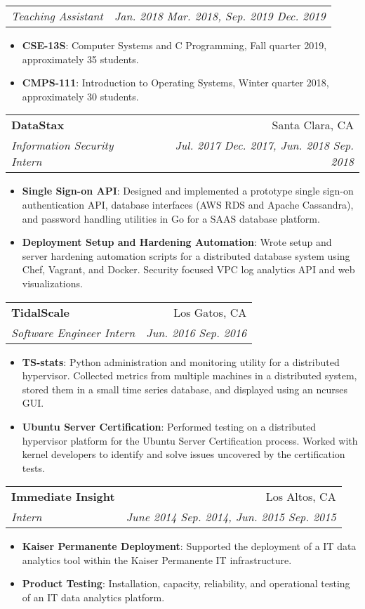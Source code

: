 \documentclass[letterpaper,10pt,oneside]{memoir}
\makeatletter
\newcommand{\resumeItem}[2]{
  \item\small{
    \textbf{#1}{: #2}
  }
}
\newcommand{\resumeSubheading}[4]{
  \vspace{1pt}%
    \begin{tabular*}{0.99\textwidth}[t]{l@{\extracolsep{\fill}}r}
      \textbf{#1} & #2 \\
      \textit{\small #3} & \textit{\small #4} \\
    \end{tabular*}
}
\newcommand{\resumeSubheadingContinue}[2]{
  \vspace{-1pt}
    \begin{tabular*}{0.99\textwidth}[t]{l@{\extracolsep{\fill}}r}
      \textit{\small #1} & \textit{\small #2} \\
    \end{tabular*}
}
\newcommand{\resumeItemListStart}{\begin{itemize}[noitemsep,nolistsep]}
\newcommand{\resumeItemListEnd}{\end{itemize}}
\makeatother
\begin{document}
    \resumeSubheadingContinue
      {Teaching Assistant}{Jan. 2018 \textemdash{} Mar. 2018, Sep. 2019 \textemdash{} Dec. 2019}
      \resumeItemListStart
        \resumeItem{CSE-13S}
          {Computer Systems and C Programming, Fall quarter 2019, approximately 35 students.}
        \resumeItem{CMPS-111}
          {Introduction to Operating Systems, Winter quarter 2018, approximately 30 students.}
      \resumeItemListEnd

    \resumeSubheading
      {DataStax}{Santa Clara, CA}
      {Information Security Intern }{ Jul. 2017 \textemdash{} Dec. 2017, Jun. 2018 \textemdash{} Sep. 2018}
      \resumeItemListStart
        \resumeItem{Single Sign-on API}
	  {Designed and implemented a prototype single sign-on authentication API, database interfaces (AWS RDS and Apache Cassandra), and password handling utilities in Go for a SAAS database platform.}
        \resumeItem{Deployment Setup and Hardening Automation}
          {Wrote setup and server hardening automation scripts for a distributed database system using Chef, Vagrant, and Docker. Security focused VPC log analytics API and web visualizations.}
      \resumeItemListEnd

    \resumeSubheading
      {TidalScale}{Los Gatos, CA}
      {Software Engineer Intern}{Jun. 2016 \textemdash{} Sep. 2016}
      \resumeItemListStart
        \resumeItem{TS-stats}
          {Python administration and monitoring utility for a distributed hypervisor. Collected metrics from multiple machines in a distributed system, stored them in a small time series database, and displayed using an ncurses GUI.}
        \resumeItem{Ubuntu Server Certification}
	  {Performed testing on a distributed hypervisor platform for the Ubuntu Server Certification process. Worked with kernel developers to identify and solve issues uncovered by the certification tests.}
      \resumeItemListEnd

    \resumeSubheading
      {Immediate Insight}{Los Altos, CA}
      {Intern}{June 2014 \textemdash{} Sep. 2014, Jun. 2015 \textemdash{} Sep. 2015}
      \resumeItemListStart
        \resumeItem{Kaiser Permanente Deployment}
	  {Supported the deployment of a IT data analytics tool within the Kaiser Permanente IT infrastructure.}
        \resumeItem{Product Testing}
          {Installation, capacity, reliability, and operational testing of an IT data analytics platform.}
      \resumeItemListEnd

\end{document}
